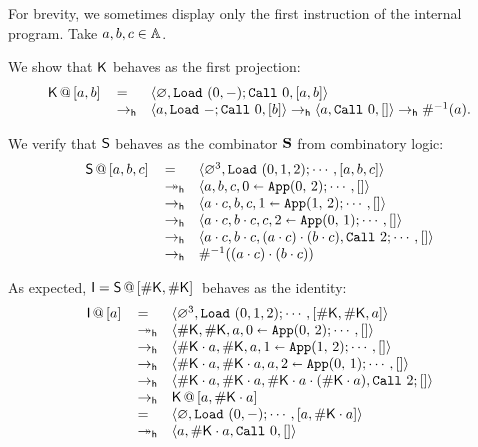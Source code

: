 \begin{exas}\label{ex:somemachines}
For brevity, we sometimes display only the first instruction of the internal program. Take $a,b,c\in\Addrs$.
\bsub
\item We show that $\mach K$ behaves as the first projection:
\[
	\begin{array}{lll}
	\append{\mK}{a,b}&=&\tuple{\Null,\RaS (0, -); \Call 0,[a,b]}\\
	&\redh&\tuple{a, \RaS -; \Call 0,[b]}
	\redh
	\tuple{a, \Call 0,[]}\redh\Lookinv a.\\
	\end{array}
\]
\item We verify that $\mach S$ behaves as the combinator $\comb{S}$ from combinatory logic:
\[
	\begin{array}{lll}
	\append{\mS}{a,b,c}&=&\tuple{\Null^3,\RaS (0,1,2); \cdots,[a,b,c]}\\
	&\reddh&\tuple{a,b,c,\Apply 020; \cdots,[]}\\
	&\redh&\tuple{\App{a}{c},b,c,\Apply 121; \cdots,[]}\\
	&\redh&\tuple{\App{a}{c},\App{b}{c},c,\Apply 012; \cdots,[]}\\
	&\redh&\tuple{\App{a}{c},\App{b}{c},\App{(\App{a}{c})}{(\App{b}{c})},\Call 2; \cdots,[]}\\
	&\redh&\Lookinv {\App{(\App{a}{c})}{(\App{b}{c})}}\\
	\end{array}
\]
\item As expected, $\mach{I}=\append{\mS}{\Lookup \mK,\Lookup \mK}$ behaves as the identity:
\[
	\begin{array}{lll}
	\append{\mach{I}}{a} &=&
	\tuple{\Null^3,\RaS (0,1,2);\cdots,[\Lookup{\mK},\Lookup{\mK},a]}\\
	&\reddh&\tuple{\Lookup{\mK},\Lookup{\mK},a,\Apply 020;\cdots,[]}\\
	&\redh&\tuple{\App{\Lookup{\mK}}{a},\Lookup{\mK},a,\Apply 121;\cdots,[]}\\
	&\redh&\tuple{\App{\Lookup{\mK}}{a},\App{\Lookup{\mK}}{a},a,\Apply 012;\cdots,[]}\\
	&\redh&\tuple{\App{\Lookup{\mK}}{a},\App{\Lookup{\mK}}{a},\App{\App{\Lookup{\mK}}{a}}{(\App{\Lookup{\mK}}{a})},\Call 2;[]}\\
	&\redh&\append{\mK}{a,\App{\Lookup{\mK}}{a}}\\
	&=&\tuple{\Null,\RaS (0,-);\cdots,[a,\App{\Lookup{\mK}}{a}]}\\
	&\reddh&\tuple{a,\App{\Lookup{\mK}}{a},\Call 0,[]}

\end{array}\]
\end{exas}
